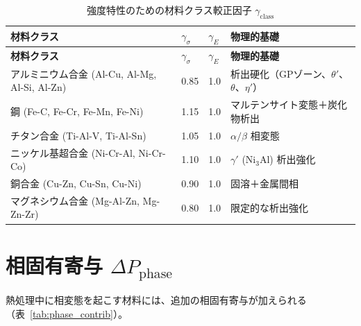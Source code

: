 \documentclass[12pt,a4paper]{article}
\begin{document}
	\begin{longtable}{p{3.5cm} p{2.5cm} p{2.5cm} p{5cm}}
		\caption{強度特性のための材料クラス較正因子 $\gamma_{\text{class}}$}\label{tab:gamma_class}\\
		\toprule
		\textbf{材料クラス} & $\gamma_{\sigma}$ & $\gamma_{E}$ & \textbf{物理的基礎} \\
		\midrule
		\endfirsthead
		\toprule
		\textbf{材料クラス} & $\gamma_{\sigma}$ & $\gamma_{E}$ & \textbf{物理的基礎} \\
		\midrule
		\endhead
		アルミニウム合金 (Al-Cu, Al-Mg, Al-Si, Al-Zn) & 0.85 & 1.0 & 析出硬化（GPゾーン、$\theta'$、$\theta$、$\eta'$） \\
		鋼 (Fe-C, Fe-Cr, Fe-Mn, Fe-Ni) & 1.15 & 1.0 & マルテンサイト変態＋炭化物析出 \\
		チタン合金 (Ti-Al-V, Ti-Al-Sn) & 1.05 & 1.0 & $\alpha/\beta$ 相変態 \\
		ニッケル基超合金 (Ni-Cr-Al, Ni-Cr-Co) & 1.10 & 1.0 & $\gamma'$ (Ni$_3$Al) 析出強化 \\
		銅合金 (Cu-Zn, Cu-Sn, Cu-Ni) & 0.90 & 1.0 & 固溶＋金属間相 \\
		マグネシウム合金 (Mg-Al-Zn, Mg-Zn-Zr) & 0.80 & 1.0 & 限定的な析出強化 \\
		\bottomrule
	\end{longtable}
	
	\section{相固有寄与 $\Delta P_{\text{phase}}$}
	熱処理中に相変態を起こす材料には、追加の相固有寄与が加えられる（表~\ref{tab:phase_contrib}）。
	
\end{document}
